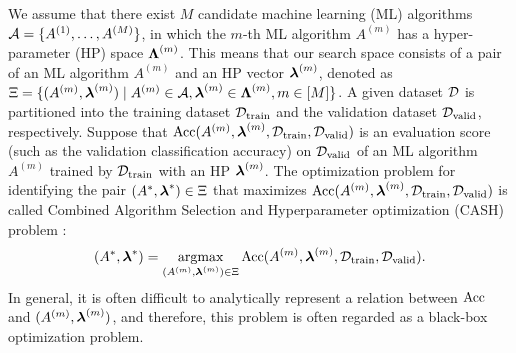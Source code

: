 We assume that there exist $M$ candidate machine learning (ML) algorithms 
${\mathcal A} = \{ A^{(1)}, \ldots, A^{(M)} \}$, 
in which  the $m$-th ML algorithm 
$A^{(m)}$ has a hyper-parameter (HP) space 
$\boldsymbol{\Lambda}^{(m)}$. 
%
This means that our search space consists of a pair of an ML algorithm $A^{(m)}$ and an HP vector $\boldsymbol{\lambda}^{(m)}$, denoted as
$\Xi = \{ (A^{(m)}, \boldsymbol{\lambda}^{(m)}) \mid A^{(m)} \in {\mathcal A}, \boldsymbol{\lambda}^{(m)} \in \boldsymbol{\Lambda}^{(m)}, m \in [M] \}$. 
%
A given dataset ${\mathcal D}$ is partitioned into  
the training dataset ${\mathcal D}_{\mathrm{train}}$
and
the validation dataset ${\mathcal D}_{\mathrm{valid}}$, respectively.
%
Suppose that 
$\mathrm{Acc}(A^{(m)}, \boldsymbol{\lambda}^{(m)}, {\mathcal D}_{\mathrm{train}},{\mathcal D}_{\mathrm{valid}})$
is an evaluation score (such as the validation classification accuracy) on
${\mathcal D}_{\mathrm{valid}}$ 
of an ML algorithm $A^{(m)}$ trained by ${\mathcal D}_{\mathrm{train}}$ with an HP
$\boldsymbol{\lambda}^{(m)}$.
%
The optimization problem for identifying the pair $(A^{*}, \boldsymbol{\lambda}^*) \in \Xi$ that maximizes 
$\mathrm{Acc}(A^{(m)}, \boldsymbol{\lambda}^{(m)}, {\mathcal D}_{\mathrm{train}},{\mathcal D}_{\mathrm{valid}})$
is called Combined Algorithm Selection and Hyperparameter optimization (CASH) problem \cite{thornton2013auto,NIPS2015_11d0e628}:
\begin{align}
 (A^{*}, \boldsymbol{\lambda}^*) = 
 \mathop{\text{argmax}}_{ (A^{(m)}, \boldsymbol{\lambda}^{(m)}) \in \Xi } 
 \mathrm{Acc}(A^{(m)}, \boldsymbol{\lambda}^{(m)}, {\mathcal D}_{\mathrm{train}},{\mathcal D}_{\mathrm{valid}}). 
 \label{eq:CASH}
\end{align}
In general, it is often difficult to analytically represent a relation between 
$\mathrm{Acc}$
and
$(A^{(m)}, \boldsymbol{\lambda}^{(m)})$, 
and therefore, this problem is often regarded as a black-box optimization problem.


